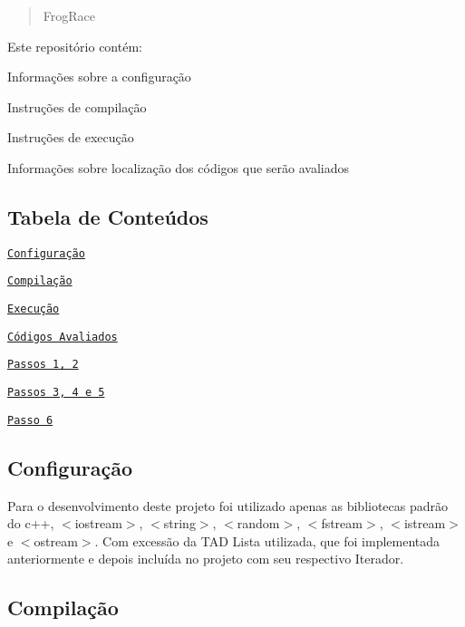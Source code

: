 \begin{quote}
Frog\+Race \end{quote}


Este repositório contém\+:


\begin{DoxyEnumerate}
\item Informações sobre a configuração
\item Instruções de compilação
\item Instruções de execução
\item Informações sobre localização dos códigos que serão avaliados
\end{DoxyEnumerate}

\subsection*{Tabela de Conteúdos}


\begin{DoxyItemize}
\item \href{#configuração}{\tt Configuração}
\item \href{#compilação}{\tt Compilação}
\item \href{#execução}{\tt Execução}
\item \href{#códigos-avaliados}{\tt Códigos Avaliados}
\begin{DoxyItemize}
\item \href{#passos-1-2}{\tt Passos 1, 2}
\item \href{#passos-3-4-5}{\tt Passos 3, 4 e 5}
\item \href{#passo-6}{\tt Passo 6}
\end{DoxyItemize}
\end{DoxyItemize}

\subsection*{Configuração}

Para o desenvolvimento deste projeto foi utilizado apenas as bibliotecas padrão do c++, $<$iostream$>$, $<$string$>$, $<$random$>$, $<$fstream$>$, $<$istream$>$ e $<$ostream$>$. Com excessão da T\+AD Lista utilizada, que foi implementada anteriormente e depois incluída no projeto com seu respectivo Iterador.

\subsection*{Compilação}

